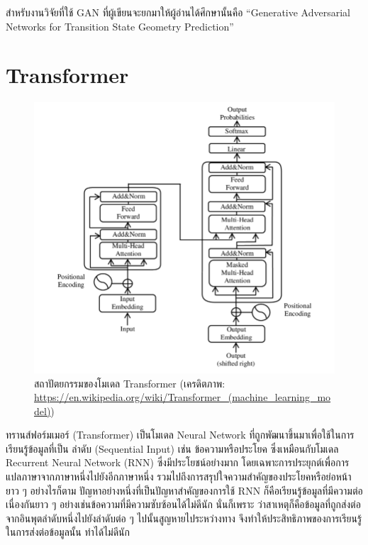 สำหรับงานวิจัยที่ใช้ GAN ที่ผู้เขียนจะยกมาให้ผู้อ่านได้ศึกษานั้นคือ \enquote{Generative Adversarial Networks for Transition State 
Geometry Prediction}\autocite{makos2021}

\section{Transformer}
\label{sec:transformer}

\begin{figure}[htbp]
    \centering
    \includegraphics[width=\linewidth]{fig/transformer.png}
    \caption{สถาปัตยกรรมของโมเดล Transformer 
    (เครดิตภาพ: \url{https://en.wikipedia.org/wiki/Transformer_(machine_learning_model)})}
    \label{fig:transformer}
\end{figure}

ทรานส์ฟอร์มเมอร์ (Transformer)\autocite{vaswani2017a} เป็นโมเดล Neural Network ที่ถูกพัฒนาขึ้นมาเพื่อใช้ในการเรียนรู้ข้อมูลที่เป็น%
ลำดับ (Sequential Input) เช่น ข้อความหรือประโยค ซึ่งเหมือนกับโมเดล Recurrent Neural Network (RNN) ซึ่งมีประโยชน์อย่างมาก%
โดยเฉพาะการประยุกต์เพื่อการแปลภาษาจากภาษาหนึ่งไปยังอีกภาษาหนึ่ง รวมไปถึงการสรุปใจความสำคัญของประโยคหรือย่อหน้ายาว ๆ อย่างไรก็ตาม 
ปัญหาอย่างหนึ่งที่เป็นปัญหาสำคัญของการใช้ RNN ก็คือเรียนรู้ข้อมูลที่มีความต่อเนื่องกันยาว ๆ อย่างเช่นข้อความที่มีความซับซ้อนได้ไม่ดีนัก นั่นก็เพราะ%
ว่าสาเหตุก็คือข้อมูลที่ถูกส่งต่อจากอินพุตลำดับหนึ่งไปยังลำดับต่อ ๆ ไปนั้นสูญหายไประหว่างทาง จึงทำให้ประสิทธิภาพของการเรียนรู้ในการส่งต่อข้อมูลนั้น%
ทำได้ไม่ดีนัก

